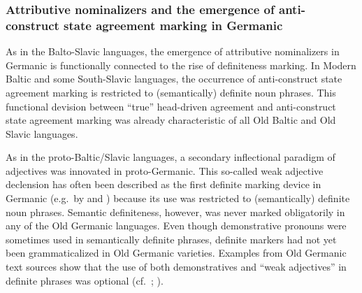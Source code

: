 \subsubsection[Germanic]{Attributive nominalizers and the emergence of anti-construct state agreement marking in Germanic} \label{germanic diachr}
As in the Balto-Slavic languages, the emergence of attributive nominalizers in Germanic is functionally connected to the rise of definiteness marking. In Modern Baltic and some South-Slavic languages, the occurrence of anti-construct state agreement marking is restricted to (semantically) definite noun phrases. This functional devision between “true” head-driven agreement and anti-construct state agreement marking was already characteristic of all Old Baltic and Old Slavic languages. 

As in the proto-Baltic/Slavic languages, a secondary inflectional paradigm of adjectives was innovated in proto-Germanic. This so-called weak adjective declension has often been described as the first definite marking device in Germanic (e.g.~by \citealt{heinrichs1954} and \citealt[170]{ringe2006}) because its use was restricted to (semantically) definite noun phrases. Semantic definiteness, however, was never marked obligatorily in any of the Old Germanic languages. Even though demonstrative pronouns were sometimes used in semantically definite phrases, definite markers had not yet been grammaticalized in Old Germanic varieties. Examples from Old Germanic text sources show that the use of both demonstratives and “weak adjectives” in definite phrases was optional (cf.~\citealt{philippi1997}; \citealt{heinrichs1954}).

